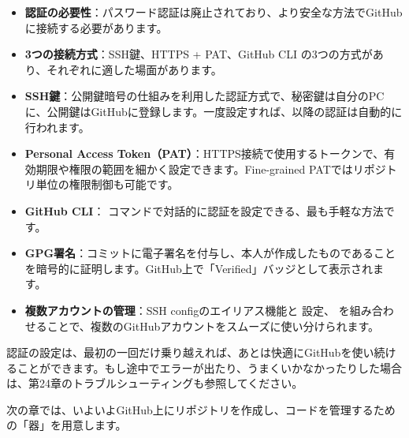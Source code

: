 \begin{itemize}
  \item \textbf{認証の必要性}：パスワード認証は廃止されており、より安全な方法でGitHubに接続する必要があります。
  \item \textbf{3つの接続方式}：SSH鍵、HTTPS + PAT、GitHub CLI の3つの方式があり、それぞれに適した場面があります。
  \item \textbf{SSH鍵}：公開鍵暗号の仕組みを利用した認証方式で、秘密鍵は自分のPCに、公開鍵はGitHubに登録します。一度設定すれば、以降の認証は自動的に行われます。
  \item \textbf{Personal Access Token（PAT）}：HTTPS接続で使用するトークンで、有効期限や権限の範囲を細かく設定できます。Fine-grained PATではリポジトリ単位の権限制御も可能です。
  \item \textbf{GitHub CLI}： コマンドで対話的に認証を設定できる、最も手軽な方法です。
  \item \textbf{GPG署名}：コミットに電子署名を付与し、本人が作成したものであることを暗号的に証明します。GitHub上で「Verified」バッジとして表示されます。
  \item \textbf{複数アカウントの管理}：SSH configのエイリアス機能と  設定、 を組み合わせることで、複数のGitHubアカウントをスムーズに使い分けられます。
\end{itemize}

認証の設定は、最初の一回だけ乗り越えれば、あとは快適にGitHubを使い続けることができます。もし途中でエラーが出たり、うまくいかなかったりした場合は、第24章のトラブルシューティングも参照してください。

次の章では、いよいよGitHub上にリポジトリを作成し、コードを管理するための「器」を用意します。
